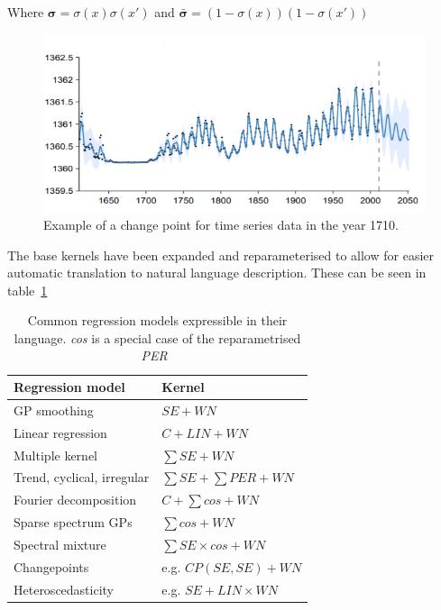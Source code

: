 \documentclass[a4paper, 10pt, conference]{ieeeconf}
\begin{document}
Where $\boldsymbol{\sigma} = \sigma(x)\sigma(x')$ and $\boldsymbol{\bar{\sigma}} = (1 - \sigma(x))(1 - \sigma(x'))$

\begin{figure}[ht!]
    \centering
    \includegraphics[width=\linewidth]{report/images/timeserieschangepoint.png}
    \caption{Example of a change point for time series data in the year 1710.~\cite{theautomaticstatistician:solar}}
    \label{fig:changepointexample}
\end{figure}

The base kernels have been expanded and reparameterised to allow for easier automatic translation to natural language description. These can be seen in table~\ref{tab:regressionmodelkernel}

\begin{table}[]
\begin{tabular}{ll}
Regression model                                & Kernel                    \\ \hline
\multicolumn{1}{l|}{GP smoothing}               & $SE + WN$                 \\
\multicolumn{1}{l|}{Linear regression}          & $C + LIN + WN$            \\
\multicolumn{1}{l|}{Multiple kernel}            & $\sum SE + WN$            \\
\multicolumn{1}{l|}{Trend, cyclical, irregular} & $\sum SE + \sum PER + WN$ \\
\multicolumn{1}{l|}{Fourier decomposition}      & $C + \sum cos + WN$       \\
\multicolumn{1}{l|}{Sparse spectrum GPs}        & $\sum cos + WN$           \\
\multicolumn{1}{l|}{Spectral mixture}           & $\sum SE \times cos + WN$ \\
\multicolumn{1}{l|}{Changepoints}               & e.g. $CP(SE, SE) + WN$    \\
\multicolumn{1}{l|}{Heteroscedasticity}         & e.g. $SE + LIN \times WN$
\end{tabular}
\caption{Common regression models expressible in their language. \textit{cos} is a special case of the reparametrised \textit{PER}~\cite{lloyd2014automatic}}
\label{tab:regressionmodelkernel}
\end{table}
\end{document}
